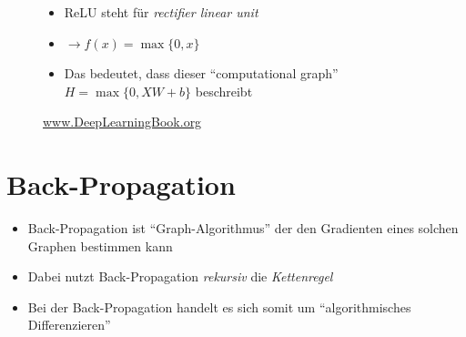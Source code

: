 \documentclass[t]{beamer}
\begin{document}
\begin{frame}
\begin{figure}
\begin{minipage}{0.45\textwidth}
\begin{itemize}
                \item ReLU steht für \emph{rectifier linear unit}
                \item \(\rightarrow f(x) = \max\{0, x\}\) \newline
                \item Das bedeutet, dass dieser \enquote{computational graph} \(H = \max\{0, XW + b\}\) beschreibt
            \end{itemize}
        \end{minipage}
        \caption{\href{http://www.deeplearningbook.org}{www.DeepLearningBook.org}}
    \end{figure}
\end{frame}

\section{Back-Propagation}
\begin{frame}
    \begin{itemize}
        \item Back-Propagation ist \enquote{Graph-Algorithmus} der den Gradienten eines solchen Graphen bestimmen kann
        \item Dabei nutzt Back-Propagation \emph{rekursiv} die \emph{Kettenregel} \newline
        \item Bei der Back-Propagation handelt es sich somit um \enquote{algorithmisches Differenzieren}
    \end{itemize}
\end{frame}
\end{document}
